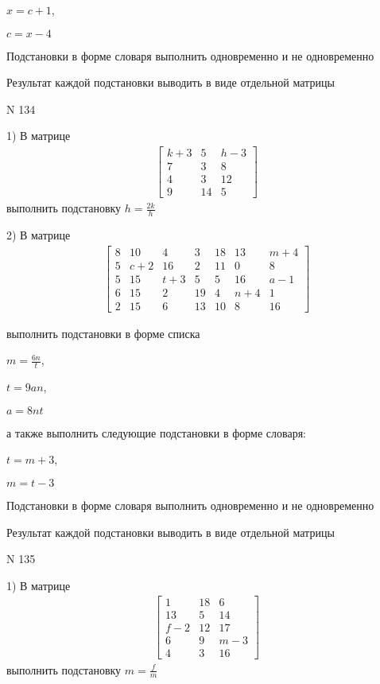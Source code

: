 \documentclass[11pt]{report}
\begin{document}
$x=c + 1$,

$c=x - 4$


    Подстановки в форме словаря выполнить одновременно и не одновременно


    Результат каждой подстановки выводить в виде отдельной матрицы

\newpage
N 134


    1) В матрице
\begin{align*}
\left[\begin{matrix}k + 3 & 5 & h - 3\\7 & 3 & 8\\4 & 3 & 12\\9 & 14 & 5\end{matrix}\right]
\end{align*}
выполнить подстановку $h=\frac{2 k}{h}$


    2) В матрице
\begin{align*}
\left[\begin{matrix}8 & 10 & 4 & 3 & 18 & 13 & m + 4\\5 & c + 2 & 16 & 2 & 11 & 0 & 8\\5 & 15 & t + 3 & 5 & 5 & 16 & a - 1\\6 & 15 & 2 & 19 & 4 & n + 4 & 1\\2 & 15 & 6 & 13 & 10 & 8 & 16\end{matrix}\right]
\end{align*}

выполнить подстановки в форме списка

$m=\frac{6 n}{t}$,

$t=9 a n$,

$a=8 n t$

а также выполнить следующие подстановки в форме словаря:

$t=m + 3$,

$m=t - 3$


    Подстановки в форме словаря выполнить одновременно и не одновременно


    Результат каждой подстановки выводить в виде отдельной матрицы

\newpage
N 135


    1) В матрице
\begin{align*}
\left[\begin{matrix}1 & 18 & 6\\13 & 5 & 14\\f - 2 & 12 & 17\\6 & 9 & m - 3\\4 & 3 & 16\end{matrix}\right]
\end{align*}
выполнить подстановку $m=\frac{f}{m}$
\end{document}
